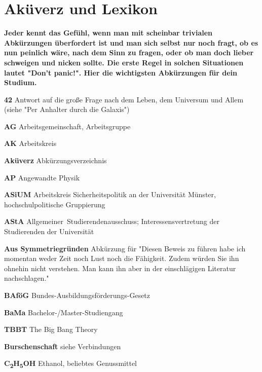 
\newcommand{\fibelabk}[2]{\textbf{#1} #2}

\section{Aküverz und Lexikon}
\begin{multicols}{2}
\textbf{Jeder kennt das Gefühl, wenn man mit scheinbar trivialen Abkürzungen überfordert ist und man sich selbst nur noch fragt, ob es nun peinlich wäre, nach dem Sinn zu fragen, oder ob man doch lieber schweigen und nicken sollte. Die erste Regel in solchen Situationen lautet "Don't panic!". Hier die wichtigsten Abkürzungen für dein Studium.}

\smallskip

\setlength{\parskip}{0.03cm}

\fibelabk{42}{Antwort auf die große Frage nach dem Leben, dem Universum und Allem (siehe "Per Anhalter durch die Galaxis")}

\fibelabk{AG}{Arbeitsgemeinschaft, Arbeitsgruppe}

\fibelabk{AK}{Arbeitskreis}

\fibelabk{Aküverz}{Abkürzungsverzeichnis}

\fibelabk{AP}{Angewandte Physik}

\fibelabk{ASiUM}{Arbeitskreis Sicherheitspolitik an der Universität Münster, hochschulpolitische Gruppierung}

\fibelabk{AStA}{Allgemeiner~Studierendenausschuss; Interessensvertretung der Studierenden der Universität}

\fibelabk{Aus Symmetriegründen}{Abkürzung für "Diesen Beweis zu führen habe ich momentan weder Zeit noch Lust noch die Fähigkeit. Zudem würden Sie ihn ohnehin nicht verstehen. Man kann ihn aber in der einschlägigen Literatur nachschlagen."}

\fibelabk{BAföG}{Bundes-Ausbildungsförderungs-Gesetz}

\fibelabk{BaMa}{Bachelor-/Master-Studiengang}

\fibelabk{TBBT}{The Big Bang Theory}

\fibelabk{Burschenschaft}{siehe Verbindungen}

\fibelabk{C\textsubscript{2}H\textsubscript{5}OH}{Ethanol, beliebtes Genussmittel}


\end{multicols}
